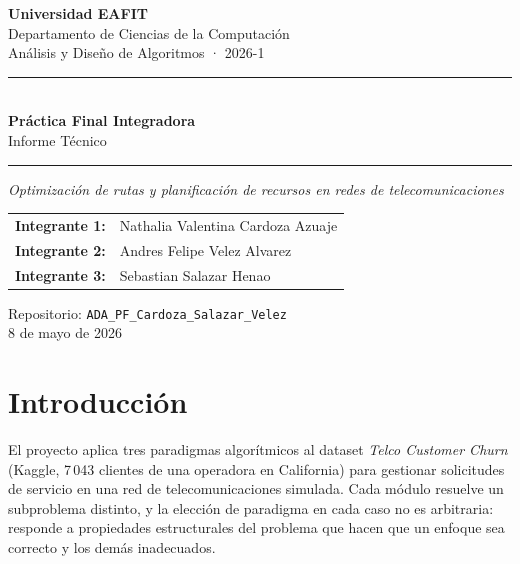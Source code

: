 \documentclass[11pt, a4paper]{article}
\begin{document}
\thispagestyle{empty}

\begin{center}
  \vspace*{1cm}
  {\large\bfseries Universidad EAFIT}\\[3pt]
  {\normalsize Departamento de Ciencias de la Computación}\\[2pt]
  {\normalsize Análisis y Diseño de Algoritmos · 2026-1}

  \vspace{1.8cm}
  \rule{\linewidth}{0.6pt}\\[8pt]
  {\LARGE\bfseries Práctica Final Integradora}\\[6pt]
  {\large Informe Técnico}\\[8pt]
  \rule{\linewidth}{0.6pt}

  \vspace{0.6cm}
  {\normalsize\itshape Optimización de rutas y planificación de recursos en redes de telecomunicaciones}

  \vspace{1.5cm}
  \begin{tabular}{rl}
    \textbf{Integrante 1:} & Nathalia Valentina Cardoza Azuaje \\[3pt]
    \textbf{Integrante 2:} & Andres Felipe Velez Alvarez \\[3pt]
    \textbf{Integrante 3:} & Sebastian Salazar Henao
  \end{tabular}

  \vspace{1cm}
  {\small Repositorio: \texttt{ADA\_PF\_Cardoza\_Salazar\_Velez}}\\[3pt]
  {\small 8 de mayo de 2026}
\end{center}

\newpage
\tableofcontents
\newpage

\section{Introducción}

El proyecto aplica tres paradigmas algorítmicos al dataset \textit{Telco Customer Churn}
(Kaggle, 7\,043 clientes de una operadora en California) para gestionar solicitudes de
servicio en una red de telecomunicaciones simulada. Cada módulo resuelve un subproblema
distinto, y la elección de paradigma en cada caso no es arbitraria: responde a propiedades
estructurales del problema que hacen que un enfoque sea correcto y los demás inadecuados.
\end{document}
